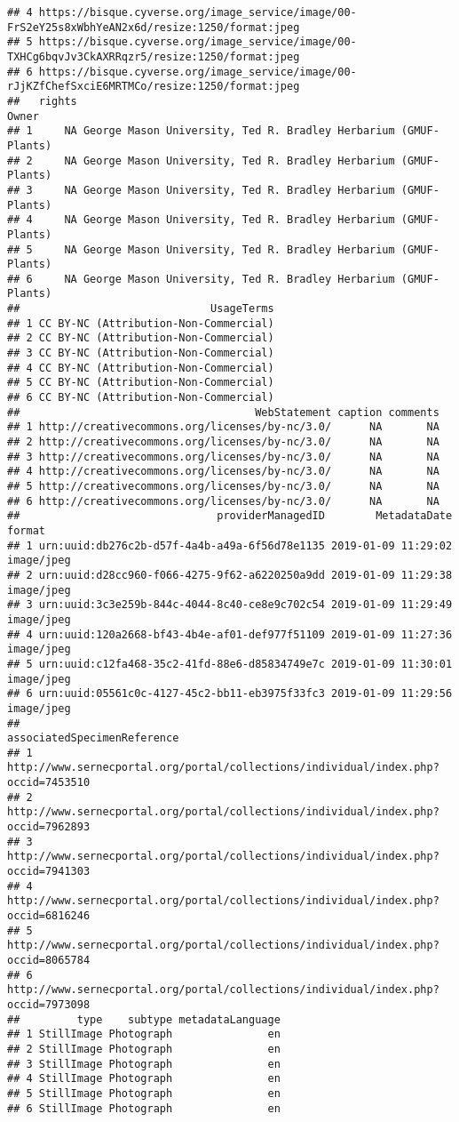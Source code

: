 \documentclass[
]{article}
\begin{document}
\begin{verbatim}
## 4 https://bisque.cyverse.org/image_service/image/00-FrS2eY25s8xWbhYeAN2x6d/resize:1250/format:jpeg
## 5 https://bisque.cyverse.org/image_service/image/00-TXHCg6bqvJv3CkAXRRqzr5/resize:1250/format:jpeg
## 6 https://bisque.cyverse.org/image_service/image/00-rJjKZfChefSxciE6MRTMCo/resize:1250/format:jpeg
##   rights                                                           Owner
## 1     NA George Mason University, Ted R. Bradley Herbarium (GMUF-Plants)
## 2     NA George Mason University, Ted R. Bradley Herbarium (GMUF-Plants)
## 3     NA George Mason University, Ted R. Bradley Herbarium (GMUF-Plants)
## 4     NA George Mason University, Ted R. Bradley Herbarium (GMUF-Plants)
## 5     NA George Mason University, Ted R. Bradley Herbarium (GMUF-Plants)
## 6     NA George Mason University, Ted R. Bradley Herbarium (GMUF-Plants)
##                              UsageTerms
## 1 CC BY-NC (Attribution-Non-Commercial)
## 2 CC BY-NC (Attribution-Non-Commercial)
## 3 CC BY-NC (Attribution-Non-Commercial)
## 4 CC BY-NC (Attribution-Non-Commercial)
## 5 CC BY-NC (Attribution-Non-Commercial)
## 6 CC BY-NC (Attribution-Non-Commercial)
##                                     WebStatement caption comments
## 1 http://creativecommons.org/licenses/by-nc/3.0/      NA       NA
## 2 http://creativecommons.org/licenses/by-nc/3.0/      NA       NA
## 3 http://creativecommons.org/licenses/by-nc/3.0/      NA       NA
## 4 http://creativecommons.org/licenses/by-nc/3.0/      NA       NA
## 5 http://creativecommons.org/licenses/by-nc/3.0/      NA       NA
## 6 http://creativecommons.org/licenses/by-nc/3.0/      NA       NA
##                               providerManagedID        MetadataDate     format
## 1 urn:uuid:db276c2b-d57f-4a4b-a49a-6f56d78e1135 2019-01-09 11:29:02 image/jpeg
## 2 urn:uuid:d28cc960-f066-4275-9f62-a6220250a9dd 2019-01-09 11:29:38 image/jpeg
## 3 urn:uuid:3c3e259b-844c-4044-8c40-ce8e9c702c54 2019-01-09 11:29:49 image/jpeg
## 4 urn:uuid:120a2668-bf43-4b4e-af01-def977f51109 2019-01-09 11:27:36 image/jpeg
## 5 urn:uuid:c12fa468-35c2-41fd-88e6-d85834749e7c 2019-01-09 11:30:01 image/jpeg
## 6 urn:uuid:05561c0c-4127-45c2-bb11-eb3975f33fc3 2019-01-09 11:29:56 image/jpeg
##                                                         associatedSpecimenReference
## 1 http://www.sernecportal.org/portal/collections/individual/index.php?occid=7453510
## 2 http://www.sernecportal.org/portal/collections/individual/index.php?occid=7962893
## 3 http://www.sernecportal.org/portal/collections/individual/index.php?occid=7941303
## 4 http://www.sernecportal.org/portal/collections/individual/index.php?occid=6816246
## 5 http://www.sernecportal.org/portal/collections/individual/index.php?occid=8065784
## 6 http://www.sernecportal.org/portal/collections/individual/index.php?occid=7973098
##         type    subtype metadataLanguage
## 1 StillImage Photograph               en
## 2 StillImage Photograph               en
## 3 StillImage Photograph               en
## 4 StillImage Photograph               en
## 5 StillImage Photograph               en
## 6 StillImage Photograph               en
\end{verbatim}
\end{document}
